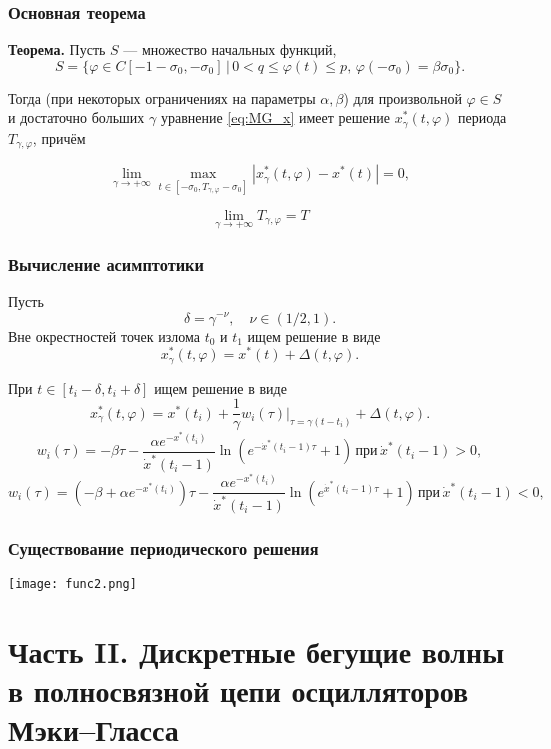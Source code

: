 \begin{frame}
	\frametitle{Основная теорема}
	\textbf{Теорема.} Пусть $S$ --- множество начальных функций,
	\[
	S = \{\varphi \in C[-1 - \sigma_0, -\sigma_0] \, | \, 0 < q \leq \varphi(t) \leq p, \, \varphi(-\sigma_0) = \beta \sigma_0\}.
	\]
	
	Тогда (при некоторых ограничениях на параметры $\alpha, \beta$) для произвольной $\varphi \in S$ и достаточно больших $\gamma$ уравнение \eqref{eq:MG_x} имеет решение $x^*_\gamma(t, \varphi)$ периода $T_{\gamma, \varphi}$, причём
	
	\[
	\lim\limits_{\gamma \to +\infty} \max\limits_{t \in [-\sigma_0, T_{\gamma, \varphi} - \sigma_0]} |x^*_\gamma(t, \varphi) - x^*(t)| = 0,
	\]
	
	\[
	\lim\limits_{\gamma \to +\infty} T_{\gamma, \varphi} = T
	\]
\end{frame}

\begin{frame}
	\frametitle{Вычисление асимптотики}
	Пусть
	$$\delta = \gamma^{-\nu}, \quad \nu \in (1/2, 1).$$
	Вне окрестностей точек излома $t_0$ и $t_1$ ищем решение в виде
	\[
	x^*_\gamma(t, \varphi) = x^*(t) + \Delta(t, \varphi).
	\]
	
	При $t \in [t_i - \delta, t_i + \delta]$ ищем решение в виде
	\[
	x^*_\gamma(t, \varphi) = x^*(t_i) + \frac{1}{\gamma} w_i(\tau)|_{\tau = \gamma(t - t_i)} + \Delta(t, \varphi).
	\]
    \[
    w_i(\tau) = -\beta \tau - \dfrac{\alpha e^{-x^*(t_i)}}{\dot{x}^*(t_i - 1)} \ln\left(e^{-\dot{x}^*(t_i - 1)\tau} + 1\right) \, \text{при} \, \dot{x}^*(t_i - 1) > 0,
    \]
    \[
    w_i(\tau) = (-\beta + \alpha e^{-x^*(t_i)})\tau - \dfrac{\alpha e^{-x^*(t_i)}}{\dot{x}^*(t_i - 1)} \ln\left(e^{\dot{x}^*(t_i - 1)\tau} + 1\right) \, \text{при} \, \dot{x}^*(t_i - 1) < 0,
    \]
\end{frame}

\begin{frame}
	\frametitle{Существование периодического решения}
	
	\begin{center}
		\texttt{[image: func2.png]}
	\end{center}
\end{frame}

\section{Часть II. Дискретные бегущие волны в полносвязной цепи осцилляторов Мэки--Гласса}


